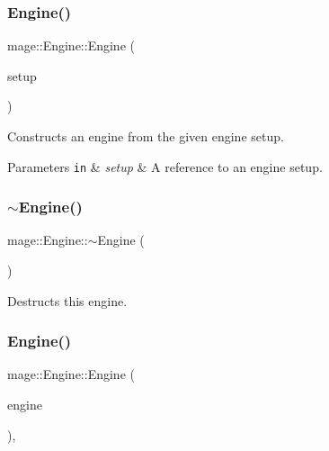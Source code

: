 \subsubsection{\texorpdfstring{Engine()}{Engine()}\hspace{0.1cm}{\footnotesize\ttfamily [1/3]}}
{\footnotesize\ttfamily mage\+::\+Engine\+::\+Engine (\begin{DoxyParamCaption}\item[{const \hyperlink{structmage_1_1_engine_setup}{Engine\+Setup} \&}]{setup }\end{DoxyParamCaption})}

Constructs an engine from the given engine setup.


\begin{DoxyParams}[1]{Parameters}
\mbox{\tt in}  & {\em setup} & A reference to an engine setup. \\
\hline
\end{DoxyParams}
\hypertarget{classmage_1_1_engine_a34628556f8397d70ed018d71e343c2f5}{}\label{classmage_1_1_engine_a34628556f8397d70ed018d71e343c2f5} 
\subsubsection{\texorpdfstring{$\sim$\+Engine()}{~Engine()}}
{\footnotesize\ttfamily mage\+::\+Engine\+::$\sim$\+Engine (\begin{DoxyParamCaption}{ }\end{DoxyParamCaption})\hspace{0.3cm}{\ttfamily [virtual]}}

Destructs this engine. \hypertarget{classmage_1_1_engine_afd2f4f32b2e803f59521aafe1924f0ba}{}\label{classmage_1_1_engine_afd2f4f32b2e803f59521aafe1924f0ba} 
\subsubsection{\texorpdfstring{Engine()}{Engine()}\hspace{0.1cm}{\footnotesize\ttfamily [2/3]}}
{\footnotesize\ttfamily mage\+::\+Engine\+::\+Engine (\begin{DoxyParamCaption}\item[{const \hyperlink{classmage_1_1_engine}{Engine} \&}]{engine }\end{DoxyParamCaption})\hspace{0.3cm}{\ttfamily [private]}, {\ttfamily [delete]}}

